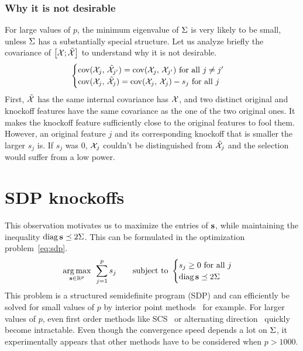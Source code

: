 \subsubsection{Why it is not desirable}

For large values of $p$,
the minimum eigenvalue of $\Sigma$ is very likely to be small,
unless $\Sigma$ has a substantially special structure.
Let us analyze briefly the covariance of $\big[ \mathcal{X}; \tilde{\mathcal{X}} \big]$ to understand why it is not desirable.
\begin{equation*}
    \begin{cases}
        \operatorname*{cov}(\mathcal{X}_j,\, \tilde{\mathcal{X}}_{j'}) = \operatorname*{cov}(\mathcal{X}_j,\, \mathcal{X}_{j'}) \text{ for all } j \neq j'\\
        \operatorname*{cov}(\mathcal{X}_j,\, \tilde{\mathcal{X}}_j) = \operatorname*{cov}(\mathcal{X}_j,\, \mathcal{X}_j) - s_j \text{ for all } j
    \end{cases}
\end{equation*}
First, $\tilde{\mathcal{X}}$ has the same internal covariance has $\mathcal{X}$,
and two distinct original and knockoff features have the same covariance as the one of the two original ones.
It makes the knockoff feature sufficiently close to the original features to fool them.
However, an original feature $j$ and its corresponding knockoff that is smaller the larger $s_j$ is.
If $s_j$ was $0$, $\mathcal{X}_j$ couldn't be distinguished from $\tilde{\mathcal{X}}_j$ and the selection would suffer from a low power.

\section{SDP knockoffs}\label{sec:sdp}

This observation motivates us to maximize the entries of $\mathbf{s}$,
while maintaining the inequality $\operatorname*{diag}\mathbf{s} \preceq 2\Sigma$.
This can be formulated in the optimization problem~\ref{eq:sdp}.
\begin{equation}\label{eq:sdp}
    \underset{\mathbf{s} \in \mathbb{R}^p}{\operatorname*{arg\,max}}\;\,
    \sum_{j = 1}^p s_j
    \qquad
    \text{subject to } \begin{cases}
        s_j \geq 0\text{ for all } j\\
        \operatorname*{diag} \mathbf{s} \preceq 2\Sigma
    \end{cases}
\end{equation}
This problem is a structured semidefinite program (SDP) and can efficiently be solved for small values of
$p$ by interior point methods~\cite{interior_point_method_sdp} for example.
For larger values of $p$, even first order methods like
SCS~\cite{sdp_scs} or alternating direction~\cite{sdp_admm}
quickly become intractable.
Even though the convergence speed depends a lot on $\Sigma$,
it experimentally appears that other methods have to be considered when $p > 1000$.

